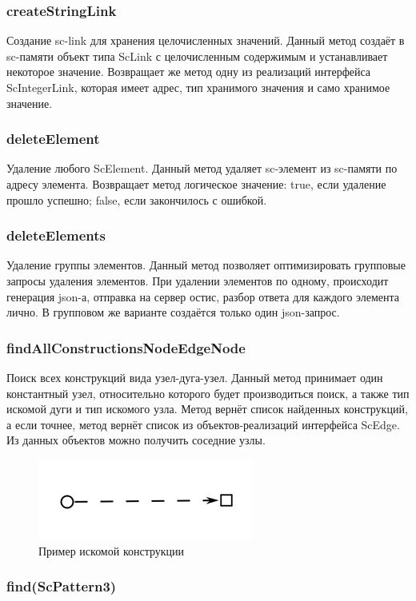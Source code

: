 \subsubsection {createStringLink} Создание sc-link для хранения целочисленных значений. Данный метод создаёт в sc-памяти объект типа ScLink с целочисленным содержимым и устанавливает некоторое значение. Возвращает же метод одну из реализаций интерфейса ScIntegerLink, которая имеет адрес, тип хранимого значения и само хранимое значение. 
\subsubsection {deleteElement} Удаление любого ScElement. Данный метод удаляет sc-элемент из sc-памяти по адресу элемента. Возвращает метод логическое значение: true, если удаление прошло успешно; false, если закончилось с ошибкой. 
\subsubsection {deleteElements} Удаление группы элементов. Данный метод позволяет оптимизировать групповые запросы удаления элементов. При удалении элементов по одному, происходит генерация json-а, отправка на сервер остис, разбор ответа для каждого элемента лично. В групповом же варианте создаётся только один json-запрос. 
\subsubsection {findAllConstructionsNodeEdgeNode} Поиск всех конструкций вида узел-дуга-узел. Данный метод принимает один константный узел, относительно которого будет производиться поиск, а также тип искомой дуги и тип искомого узла. Метод вернёт список найденных конструкций, а если точнее, метод вернёт список из объектов-реализаций интерфейса ScEdge. Из данных объектов можно получить соседние узлы. 
\begin{figure}[H]
    \centering
    \includegraphics{images/sc-context/node-edge-node.png}
    \caption{Пример искомой конструкции}
    \label{json_ex}
\end{figure}

\subsubsection{find(ScPattern3)} 

